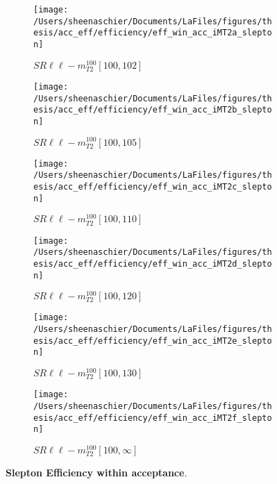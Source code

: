\begin{figure}
        \centering
    \begin{subfigure}[b]{0.44\textwidth}
        \texttt{[image: /Users/sheenaschier/Documents/LaFiles/figures/thesis/acc\_eff/efficiency/eff\_win\_acc\_iMT2a\_slepton]}
    \caption{$SR\ell\ell-m^{100}_{T2}[100,102]$}
    \end{subfigure}
    \begin{subfigure}[b]{0.44\textwidth}
        \texttt{[image: /Users/sheenaschier/Documents/LaFiles/figures/thesis/acc\_eff/efficiency/eff\_win\_acc\_iMT2b\_slepton]}
    \caption{$SR\ell\ell-m^{100}_{T2}[100,105]$}
    \end{subfigure}
    \begin{subfigure}[b]{0.44\textwidth}
        \texttt{[image: /Users/sheenaschier/Documents/LaFiles/figures/thesis/acc\_eff/efficiency/eff\_win\_acc\_iMT2c\_slepton]}
    \caption{$SR\ell\ell-m^{100}_{T2}[100,110]$}
    \end{subfigure}
    \begin{subfigure}[b]{0.44\textwidth}
        \texttt{[image: /Users/sheenaschier/Documents/LaFiles/figures/thesis/acc\_eff/efficiency/eff\_win\_acc\_iMT2d\_slepton]}
    \caption{$SR\ell\ell-m^{100}_{T2}[100,120]$}
    \end{subfigure}
    \begin{subfigure}[b]{0.44\textwidth}
        \texttt{[image: /Users/sheenaschier/Documents/LaFiles/figures/thesis/acc\_eff/efficiency/eff\_win\_acc\_iMT2e\_slepton]}
    \caption{$SR\ell\ell-m^{100}_{T2}[100,130]$}
    \end{subfigure}
    \begin{subfigure}[b]{0.44\textwidth}
        \texttt{[image: /Users/sheenaschier/Documents/LaFiles/figures/thesis/acc\_eff/efficiency/eff\_win\_acc\_iMT2f\_slepton]}
    \caption{$SR\ell\ell-m^{100}_{T2}[100,\infty]$}
    \end{subfigure}
    \caption{\label{fig:slepton_efficiency_in_acceptance}\textbf{Slepton Efficiency within acceptance}.}
\end{figure}


